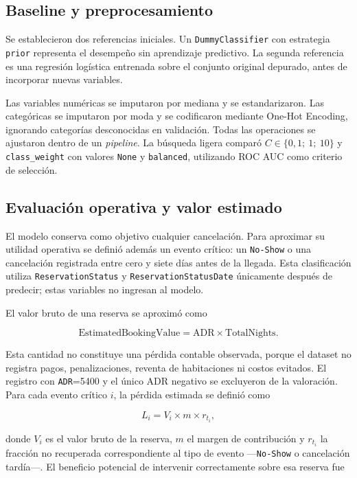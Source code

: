 \subsection{Baseline y preprocesamiento}

Se establecieron dos referencias iniciales. Un \texttt{DummyClassifier} con
estrategia \texttt{prior} representa el desempeño sin aprendizaje predictivo.
La segunda referencia es una regresión logística entrenada sobre el conjunto
original depurado, antes de incorporar nuevas variables.

Las variables numéricas se imputaron por mediana y se estandarizaron. Las
categóricas se imputaron por moda y se codificaron mediante One-Hot Encoding,
ignorando categorías desconocidas en validación. Todas las operaciones se
ajustaron dentro de un \textit{pipeline}. La búsqueda ligera comparó
$C\in\{0{,}1;\ 1;\ 10\}$ y \texttt{class\_weight} con valores \texttt{None} y
\texttt{balanced}, utilizando ROC AUC como criterio de selección.

\subsection{Evaluación operativa y valor estimado}

El modelo conserva como objetivo cualquier cancelación. Para aproximar su
utilidad operativa se definió además un evento crítico: un \texttt{No-Show} o
una cancelación registrada entre cero y siete días antes de la llegada. Esta
clasificación utiliza \texttt{ReservationStatus} y
\texttt{ReservationStatusDate} únicamente después de predecir; estas variables
no ingresan al modelo.

El valor bruto de una reserva se aproximó como

\[
    \text{EstimatedBookingValue}
    = \text{ADR}\times\text{TotalNights}.
\]

Esta cantidad no constituye una pérdida contable observada, porque el dataset
no registra pagos, penalizaciones, reventa de habitaciones ni costos evitados.
El registro con \texttt{ADR}=5400 y el único ADR negativo se excluyeron de la
valoración. Para cada evento crítico $i$, la pérdida estimada se definió como

\[
    L_i = V_i \times m \times r_{t_i},
\]

donde $V_i$ es el valor bruto de la reserva, $m$ el margen de contribución y
$r_{t_i}$ la fracción no recuperada correspondiente al tipo de evento
---\texttt{No-Show} o cancelación tardía---. El beneficio potencial de
intervenir correctamente sobre esa reserva fue

